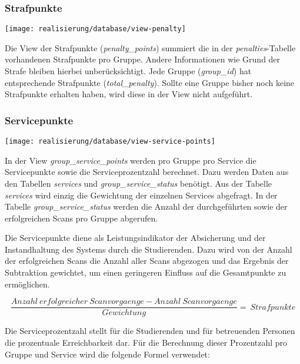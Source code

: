 \subsubsection{Strafpunkte}
\begin{center}
	\texttt{[image: realisierung/database/view-penalty]}
	\label{fig:realisierung-view-penalty}
\end{center}

Die View der Strafpunkte (\textit{penalty\_points}) summiert die in der \textit{penalties}-Tabelle vorhandenen Strafpunkte pro Gruppe. Andere Informationen wie Grund der Strafe bleiben hierbei unberücksichtigt. Jede Gruppe (\textit{group\_id}) hat entsprechende Strafpunkte (\textit{total\_penalty}). Sollte eine Gruppe bisher noch keine Strafpunkte erhalten haben, wird diese in der View nicht aufgeführt.

\subsubsection{Servicepunkte}
\begin{center}
	\texttt{[image: realisierung/database/view-service-points]}
	\label{fig:realisierung-view-service-points}
\end{center}

In der View \textit{group\_service\_points} werden pro Gruppe pro Service die Servicepunkte sowie die Serviceprozentzahl berechnet. Dazu werden Daten aus den Tabellen \textit{services} und \textit{group\_service\_status} benötigt. Aus der Tabelle \textit{services} wird einzig die Gewichtung der einzelnen Services abgefragt. In der Tabelle \textit{group\_service\_status} werden die Anzahl der durchgeführten sowie der erfolgreichen Scans pro Gruppe abgerufen.

Die Servicepunkte diene als Leistungsindikator der Absicherung und der Instandhaltung des Systems durch die Studierenden. Dazu wird von der Anzahl der erfolgreichen Scans die Anzahl aller Scans abgezogen und das Ergebnis der Subtraktion gewichtet, um einen geringeren Einfluss auf die Gesamtpunkte zu ermöglichen.

\begin{equation*}
	\frac{Anzahl~erfolgreicher~Scanvorgaenge - Anzahl~Scanvorgaenge}{Gewichtung}=~Strafpunkte
\end{equation*}


Die Serviceprozentzahl stellt für die Studierenden und für betreuenden Personen die prozentuale Erreichbarkeit dar. Für die Berechnung dieser Prozentzahl pro Gruppe und Service wird die folgende Formel verwendet: 

